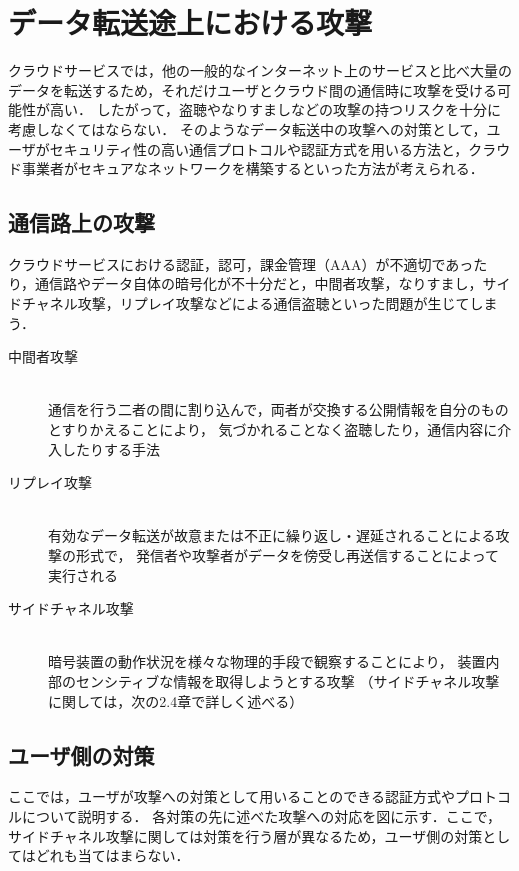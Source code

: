 \section{データ転送途上における攻撃}
クラウドサービスでは，他の一般的なインターネット上のサービスと比べ大量のデータを転送するため，それだけユーザとクラウド間の通信時に攻撃を受ける可能性が高い．
したがって，盗聴やなりすましなどの攻撃の持つリスクを十分に考慮しなくてはならない．
そのようなデータ転送中の攻撃への対策として，ユーザがセキュリティ性の高い通信プロトコルや認証方式を用いる方法と，クラウド事業者がセキュアなネットワークを構築するといった方法が考えられる．

\subsection{通信路上の攻撃}
クラウドサービスにおける認証，認可，課金管理（AAA）が不適切であったり，通信路やデータ自体の暗号化が不十分だと，中間者攻撃，なりすまし，サイドチャネル攻撃，リプレイ攻撃などによる通信盗聴といった問題が生じてしまう．

\begin{description}
	\item[中間者攻撃]\mbox{}\\ 
		通信を行う二者の間に割り込んで，両者が交換する公開情報を自分のものとすりかえることにより，
		気づかれることなく盗聴したり，通信内容に介入したりする手法	
	
	\item[リプレイ攻撃]\mbox{}\\
		有効なデータ転送が故意または不正に繰り返し・遅延されることによる攻撃の形式で，
		発信者や攻撃者がデータを傍受し再送信することによって実行される

	\item[サイドチャネル攻撃]\mbox{}\\
		暗号装置の動作状況を様々な物理的手段で観察することにより，
		装置内部のセンシティブな情報を取得しようとする攻撃
		（サイドチャネル攻撃に関しては，次の2.4章で詳しく述べる）
\end{description}

\subsection{ユーザ側の対策}
ここでは，ユーザが攻撃への対策として用いることのできる認証方式やプロトコルについて説明する．
各対策の先に述べた攻撃への対応を図に示す．ここで，サイドチャネル攻撃に関しては対策を行う層が異なるため，ユーザ側の対策としてはどれも当てはまらない．\\

